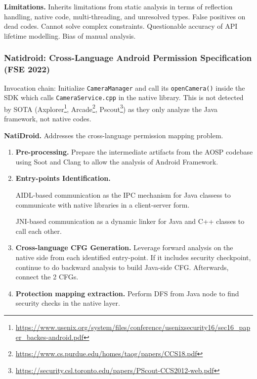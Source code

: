\textbf{Limitations.} Inherits limitations from static analysis in terms of reflection handling, native code, multi-threading, and unresolved types. False positives on dead codes. Cannot solve complex constraints. Questionable accuracy of API lifetime modelling. Bias of manual analysis. 




\subsubsection{Natidroid: Cross-Language Android Permission Specification (FSE 2022)}

Invocation chain: Initialize \texttt{CameraManager} and call its \texttt{openCamera()} inside the SDK which calls \texttt{CameraService.cpp} in the native library. This is not detected by SOTA (Axplorer\footnote{\url{https://www.usenix.org/system/files/conference/usenixsecurity16/sec16_paper_backes-android.pdf}}, Arcade\footnote{\url{https://www.cs.purdue.edu/homes/taog/papers/CCS18.pdf}}, Pscout\footnote{\url{https://security.csl.toronto.edu/papers/PScout-CCS2012-web.pdf}}) as they only analyze the Java framework, not native codes.

\textbf{NatiDroid.} Addresses the cross-language permission mapping problem.

\begin{enumerate}
    \item \textbf{Pre-processing.} Prepare the intermediate artifacts from the AOSP codebase using Soot and Clang to allow the analysis of Android Framework.

    \item \textbf{Entry-points Identification.} 
    
    AIDL-based communication as the IPC mechanism for Java classess to communicate with native libraries in a client-server form. 

    JNI-based communication as a dynamic linker for Java and C++ classes to call each other.  

    \item \textbf{Cross-language CFG Generation.} Leverage forward analysis on the native side from each identified entry-point. If it includes security checkpoint, continue to do backward analysis to build Java-side CFG. Afterwards, connect the 2 CFGs.




    \item \textbf{Protection mapping extraction.} Perform DFS from Java node to find security checks in the native layer.

\end{enumerate}

